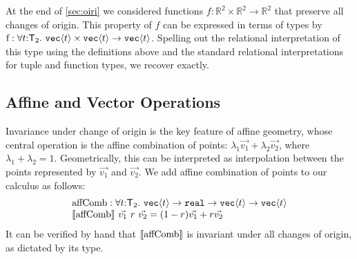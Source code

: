 At the end of \autoref{sec:oiri} we considered functions $f :
\mathbb{R}^2 \times \mathbb{R}^2 \to \mathbb{R}^2$ that preserve all
changes of origin. This property of $f$ can be expressed in terms of
types by
$  \mathrm{f} : \forall t \mathord: \SynTransl{2}.\ \tyPrim{vec}{t}
  \times \tyPrim{vec}{t} \to \tyPrim{vec}{t}$.
Spelling out the relational interpretation of this type using the
definitions above and the standard relational interpretations for
tuple and function types, we recover
 exactly.

\subsection{Affine and Vector Operations}
\label{sec:affine-vector-ops}

Invariance under change of origin is the key feature of affine
geometry, whose central operation is the affine combination of points:
$\lambda_1\vec{v_1} + \lambda_2\vec{v_2}$, where $\lambda_1 +
\lambda_2 = 1$.  Geometrically, this can be interpreted as
interpolation between the points represented by $\vec{v_1}$ and
$\vec{v_2}$.  We add affine combination of points to our calculus as
follows: %
\begin{displaymath}
  \begin{array}{l}
    \mathrm{affComb} :\forall t \mathord:
    \mathsf{T}_2.\ \textup{\texttt{vec}}\langle t \rangle \to \textup{\texttt{real}} \to
    \textup{\texttt{vec}}\langle t \rangle \to \textup{\texttt{vec}}\langle t \rangle \\ 
    \llbracket \mathrm{affComb} \rrbracket\ \vec{v_1}\ r\ \vec{v_2} = (1-r)\vec{v_1} +
    r\vec{v_2} 
\end{array}
\end{displaymath}
It can be verified by hand that %
$\llbracket \mathrm{affComb} \rrbracket$ is invariant under all changes of origin, as
dictated by its type.

